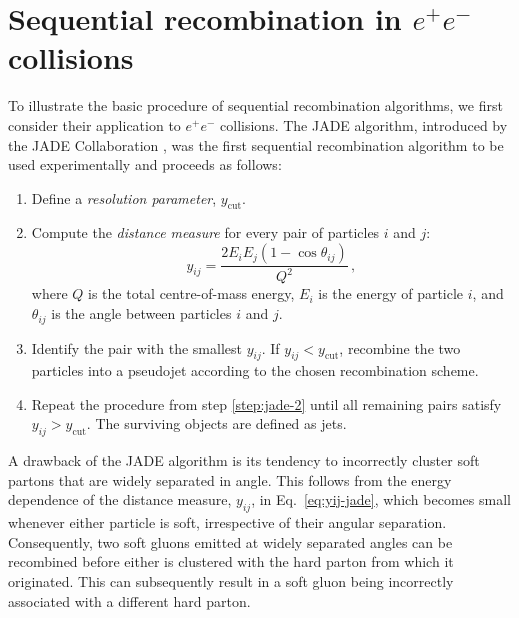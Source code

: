 \section{Sequential recombination in $e^+e^-$ collisions}
\label{sec:ee-algos}

To illustrate the basic procedure of sequential recombination algorithms,
we first consider their application to $e^+e^-$ collisions. The JADE
algorithm, introduced by the \textsc{JADE} Collaboration
\cite{JADE:1988xlj}, was the first sequential recombination algorithm to
be used experimentally and proceeds as follows:
\begin{enumerate}
    \item Define a \emph{resolution parameter}, $y_{\mathrm{cut}}$.
    \item \label{step:jade-2} Compute the \emph{distance measure} for every pair of 
    particles $i$ and $j$:
    \begin{equation}
        \label{eq:yij-jade}
        y_{ij} = \frac{2E_iE_j(1 - \cos\theta_{ij})}{Q^2}\,,
    \end{equation}
    where $Q$ is the total centre-of-mass energy, $E_i$ is the energy of particle $i$, and $\theta_{ij}$ is the angle between particles $i$ and $j$.
    \item Identify the pair with the smallest $y_{ij}$. If $y_{ij} < y_{\mathrm{cut}}$, 
    recombine the two particles into a pseudojet according to the chosen recombination scheme.
    \item Repeat the procedure from step \ref{step:jade-2} until all remaining pairs satisfy $y_{ij} > y_{\mathrm{cut}}$. The surviving objects are defined as jets.
\end{enumerate}
A drawback of the JADE algorithm is its tendency to incorrectly cluster
soft partons that are widely separated in angle. This follows from the
energy dependence of the distance measure, $y_{ij}$, in Eq.~\eqref{eq:yij-jade},
which becomes small whenever either particle is soft, irrespective of
their angular separation. Consequently, two soft gluons emitted at widely
separated angles can be recombined before either is clustered with the
hard parton from which it originated. This can subsequently result in a
soft gluon being incorrectly associated with a different hard parton.

